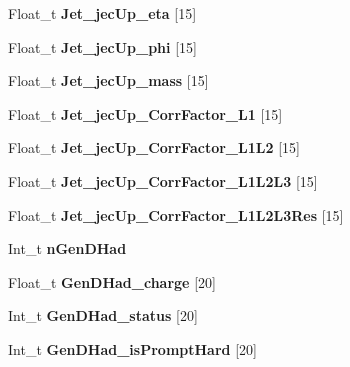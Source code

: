 \begin{DoxyCompactItemize}
\hypertarget{classMiniTree_aea93880c8bf5a007ac17f225bc70595e}{}\label{classMiniTree_aea93880c8bf5a007ac17f225bc70595e} 
Float\+\_\+t {\bfseries Jet\+\_\+jec\+Up\+\_\+eta} \mbox{[}15\mbox{]}
\item 
\hypertarget{classMiniTree_a35c66ae5bc0c2b5ef75afcf6f2766be9}{}\label{classMiniTree_a35c66ae5bc0c2b5ef75afcf6f2766be9} 
Float\+\_\+t {\bfseries Jet\+\_\+jec\+Up\+\_\+phi} \mbox{[}15\mbox{]}
\item 
\hypertarget{classMiniTree_a1902b4a88c401fec22ce444bba77bdf1}{}\label{classMiniTree_a1902b4a88c401fec22ce444bba77bdf1} 
Float\+\_\+t {\bfseries Jet\+\_\+jec\+Up\+\_\+mass} \mbox{[}15\mbox{]}
\item 
\hypertarget{classMiniTree_a4aa3163e693fb3de45138a5c34b3ebd1}{}\label{classMiniTree_a4aa3163e693fb3de45138a5c34b3ebd1} 
Float\+\_\+t {\bfseries Jet\+\_\+jec\+Up\+\_\+\+Corr\+Factor\+\_\+\+L1} \mbox{[}15\mbox{]}
\item 
\hypertarget{classMiniTree_aa2eea827574b64932fca75a271294d00}{}\label{classMiniTree_aa2eea827574b64932fca75a271294d00} 
Float\+\_\+t {\bfseries Jet\+\_\+jec\+Up\+\_\+\+Corr\+Factor\+\_\+\+L1\+L2} \mbox{[}15\mbox{]}
\item 
\hypertarget{classMiniTree_a5d8d920ecaee24fc516f430134e6fb5e}{}\label{classMiniTree_a5d8d920ecaee24fc516f430134e6fb5e} 
Float\+\_\+t {\bfseries Jet\+\_\+jec\+Up\+\_\+\+Corr\+Factor\+\_\+\+L1\+L2\+L3} \mbox{[}15\mbox{]}
\item 
\hypertarget{classMiniTree_a2c90387f326e92222eff130629142009}{}\label{classMiniTree_a2c90387f326e92222eff130629142009} 
Float\+\_\+t {\bfseries Jet\+\_\+jec\+Up\+\_\+\+Corr\+Factor\+\_\+\+L1\+L2\+L3\+Res} \mbox{[}15\mbox{]}
\item 
\hypertarget{classMiniTree_af4246f9f6d6fc3969bace4ac905ae2b5}{}\label{classMiniTree_af4246f9f6d6fc3969bace4ac905ae2b5} 
Int\+\_\+t {\bfseries n\+Gen\+D\+Had}
\item 
\hypertarget{classMiniTree_a1f651c54338d398a0df1207b6ba42c7d}{}\label{classMiniTree_a1f651c54338d398a0df1207b6ba42c7d} 
Float\+\_\+t {\bfseries Gen\+D\+Had\+\_\+charge} \mbox{[}20\mbox{]}
\item 
\hypertarget{classMiniTree_a5abc660931021cb0a40694c3597a27be}{}\label{classMiniTree_a5abc660931021cb0a40694c3597a27be} 
Int\+\_\+t {\bfseries Gen\+D\+Had\+\_\+status} \mbox{[}20\mbox{]}
\item 
\hypertarget{classMiniTree_abe9189f8325cd3d7cedaf0bc267905cb}{}\label{classMiniTree_abe9189f8325cd3d7cedaf0bc267905cb} 
Int\+\_\+t {\bfseries Gen\+D\+Had\+\_\+is\+Prompt\+Hard} \mbox{[}20\mbox{]}

\end{DoxyCompactItemize}
